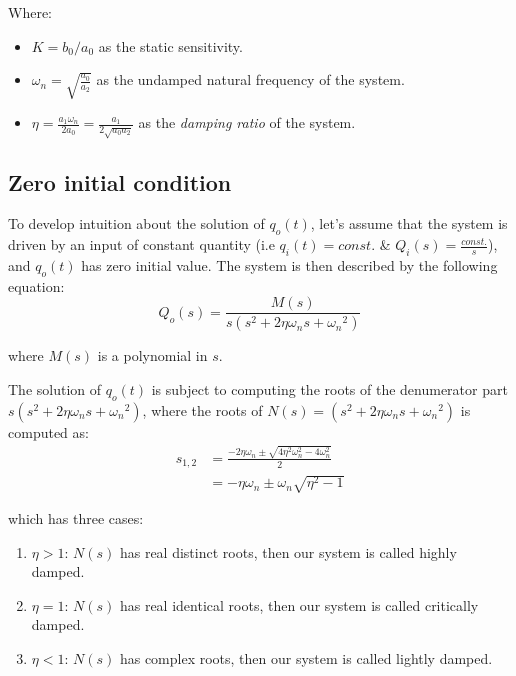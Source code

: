\documentclass[a4paper,11pt,dvipsnames]{book}
\begin{document}
Where: \begin{itemize}
\item $K = b_0/a_0$ as the static sensitivity.
\item $\omega_n=\sqrt{\frac{a_0}{a_2}}$ as the undamped natural frequency of the system.
\item $\eta = \frac{a_1 \omega_n}{ 2a_0} = \frac{a_1}{2 \sqrt{a_0a_2}}$ as the \emph{damping ratio} of the system.
\end{itemize} 

\subsection*{Zero initial condition}
To develop intuition about the solution of $q_o(t)$, let's assume that the system is driven by an input of constant quantity (i.e $q_i(t)=const.$ \& $Q_i(s)=\frac{const.}{s}$), and $q_o(t)$ has zero initial value. The system is then described by the following equation:
\begin{equation}\label{eqn:zi-second-order}
Q_o(s) = \frac{ M(s) }{ s(s^2 + 2 \eta \omega_n s + {\omega_n}^2)}
\end{equation}

where $M(s)$ is a polynomial in $s$.

The solution of $q_o(t)$ is subject to computing the roots of the denumerator part $s(s^2 + 2 \eta \omega_n s + {\omega_n}^2)$, where the roots of  $N(s)=(s^2 + 2 \eta \omega_n s + {\omega_n}^2)$ is computed as:
\begin{align}
s_{1,2} &= \frac{-2\eta \omega_n \pm \sqrt{4\eta^2 \omega_n^2 - 4 \omega_n^2}}{2} \\
 &= -\eta \omega_n \pm \omega_n \sqrt{\eta^2 - 1}
\end{align}

which has three cases:
\begin{enumerate}
\item $\eta > 1$: $N(s)$ has real distinct roots, then our system is called highly damped.
\item $\eta = 1$: $N(s)$ has real identical roots, then our system is called critically damped.
\item $\eta < 1$: $N(s)$ has complex roots, then our system is called lightly damped.
\end{enumerate}
\end{document}
